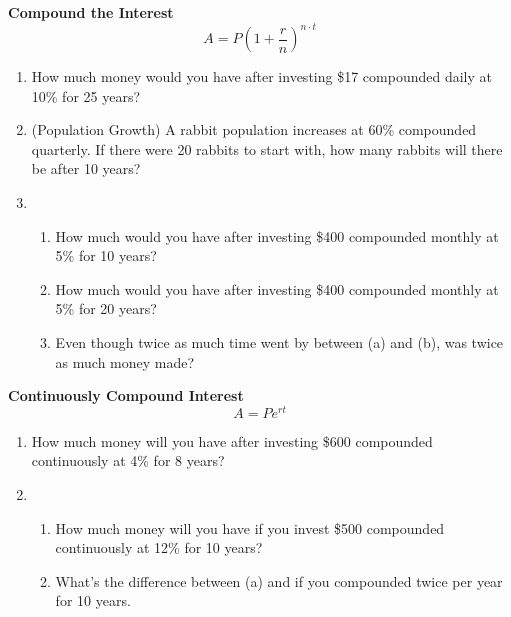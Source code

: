 \documentclass[12pt]{article}
\begin{document}
\hrulefill

\textbf{Compound the Interest}\\

$$A=P\left(1+\frac{r}{n}\right)^{n \cdot t}$$

\begin{enumerate}[resume]

\item How much money would you have after investing \$17 compounded daily at 10\% for 25 years?\\

\item (Population Growth) A rabbit population increases at 60\% compounded quarterly. If there were 20 rabbits to start with, how many rabbits will there be after 10 years?\\

\item 	\begin{enumerate}

			\item How much would you have after investing \$400 compounded monthly at 5\% for 10 years?\\

			\item How much would you have after investing \$400 compounded monthly at 5\% for 20 years?\\
			
			\item Even though twice as much time went by between (a) and (b), was twice as much money made?\\

		\end{enumerate} 

\end{enumerate}

\hrulefill

\textbf{Continuously Compound Interest}\\

$$A=Pe^{rt}$$

\begin{enumerate}[resume]

\item How much money will you have after investing \$600 compounded continuously at 4\% for 8 years?\\

\vspace{1cm}

\item 	\begin{enumerate}
		
			\item How much money will you have if you invest \$500 compounded continuously at 12\% for 10 years?\\
			
			\item What's the difference between (a) and if you compounded twice per year for 10 years.\\
			
		\end{enumerate}

\end{enumerate}
\end{document}
